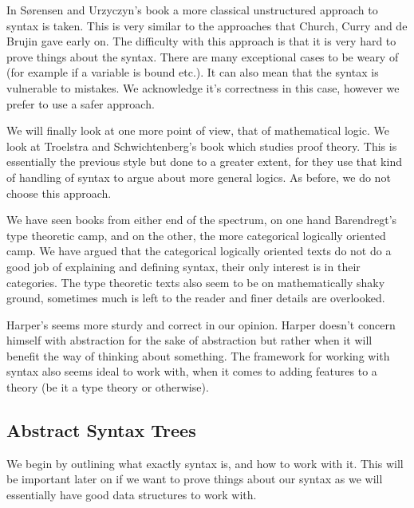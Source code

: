 In S{\o}rensen and Urzyczyn's book \cite{Sorensen:2006:LCI:1197021} a more classical unstructured approach to syntax is taken. This is very similar to the approaches that Church, Curry and de Brujin gave early on. The difficulty with this approach is that it is very hard to prove things about the syntax. There are many exceptional cases to be weary of (for example if a variable is bound etc.). It can also mean that the syntax is vulnerable to mistakes. We acknowledge it's correctness in this case, however we prefer to use a safer approach.

We will finally look at one more point of view, that of mathematical logic. We look at Troelstra and Schwichtenberg's book \cite{troelstra_schwichtenberg_2000} which studies proof theory. This is essentially the previous style but done to a greater extent, for they use that kind of handling of syntax to argue about more general logics. As before, we do not choose this approach.

We have seen books from either end of the spectrum, on one hand Barendregt's type theoretic camp, and on the other, the more categorical logically oriented camp. We have argued that the categorical logically oriented texts do not do a good job of explaining and defining syntax, their only interest is in their categories. The type theoretic texts also seem to be on mathematically shaky ground, sometimes much is left to the reader and finer details are overlooked.

Harper's seems more sturdy and correct in our opinion. Harper doesn't concern himself with abstraction for the sake of abstraction but rather when it will benefit the way of thinking about something. The framework for working with syntax also seems ideal to work with, when it comes to adding features to a theory (be it a type theory or otherwise).

\subsection{Abstract Syntax Trees}

We begin by outlining what exactly syntax is, and how to work with it. This will be important later on if we want to prove things about our syntax as we will essentially have good data structures to work with.


